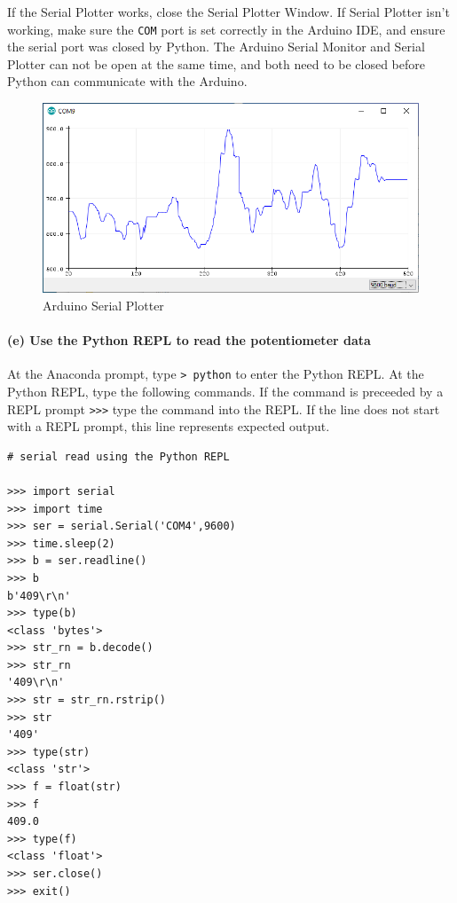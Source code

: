 \documentclass[11pt]{article}
\begin{document}
If the Serial Plotter works, close the Serial Plotter Window. If Serial
Plotter isn't working, make sure the
\texttt{\textquotesingle{}COM\textquotesingle{}} port is set correctly
in the Arduino IDE, and ensure the serial port was closed by Python. The
Arduino Serial Monitor and Serial Plotter can not be open at the same
time, and both need to be closed before Python can communicate with the
Arduino.

\begin{figure}[H]
\centering
\includegraphics{images/serial_plotter_output.png}
\caption{Arduino Serial Plotter}
\end{figure}

    \hypertarget{e-use-the-python-repl-to-read-the-potentiometer-data}{%
\paragraph{(e) Use the Python REPL to read the potentiometer
data}\label{e-use-the-python-repl-to-read-the-potentiometer-data}}

At the Anaconda prompt, type \texttt{\textgreater{}\ python} to enter
the Python REPL. At the Python REPL, type the following commands. If the
command is preceeded by a REPL prompt
\texttt{\textgreater{}\textgreater{}\textgreater{}} type the command
into the REPL. If the line does not start with a REPL prompt, this line
represents expected output.

\begin{verbatim}
# serial read using the Python REPL

>>> import serial
>>> import time
>>> ser = serial.Serial('COM4',9600)
>>> time.sleep(2)
>>> b = ser.readline()
>>> b
b'409\r\n'
>>> type(b)
<class 'bytes'>
>>> str_rn = b.decode()
>>> str_rn
'409\r\n'
>>> str = str_rn.rstrip()
>>> str
'409'
>>> type(str)
<class 'str'>
>>> f = float(str)
>>> f
409.0
>>> type(f)
<class 'float'>
>>> ser.close()
>>> exit()
\end{verbatim}
\end{document}
